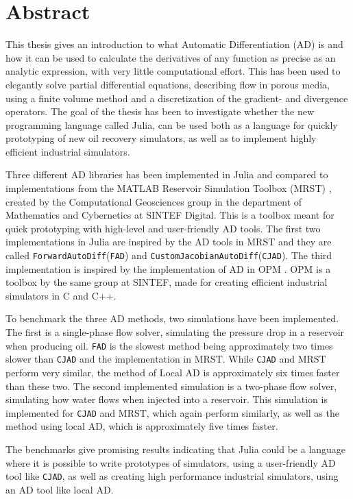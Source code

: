 \chapter*{Abstract}
This thesis gives an introduction to what Automatic Differentiation (AD) is and how it can be used to calculate the derivatives of any function as precise as an analytic expression, with very little computational effort. This has been used to elegantly solve partial differential equations, describing flow in porous media, using a finite volume method and a discretization of the gradient- and divergence operators. The goal of the thesis has been to investigate whether the new programming language called Julia, can be used both as a language for quickly prototyping of new oil recovery simulators, as well as to implement highly efficient industrial simulators.

Three different AD libraries has been implemented in Julia and compared to implementations from the MATLAB Reservoir Simulation Toolbox (MRST) \emph{\citep{mrstHomepage}}, created by the Computational Geosciences  group  in  the  department  of  Mathematics  and  Cybernetics  at  SINTEF Digital. This is a toolbox meant for quick prototyping with high-level and user-friendly AD tools. The first two implementations in Julia are inspired by the AD tools in MRST and they are called \texttt{ForwardAutoDiff}(\texttt{FAD}) and \texttt{CustomJacobianAutoDiff}(\texttt{CJAD}). The third implementation is inspired by the implementation of AD in OPM \emph{\citep{opm}}. OPM is a toolbox by the same group at SINTEF, made for creating efficient industrial simulators in C and C++. 

To benchmark the three AD methods, two simulations have been implemented. The first is a single-phase flow solver, simulating the pressure drop in a reservoir when producing oil. \texttt{FAD} is the slowest method being approximately two times slower than \texttt{CJAD} and the implementation in MRST. While \texttt{CJAD} and MRST perform very similar, the method of Local AD is approximately six times faster than these two. The second implemented simulation is a two-phase flow solver, simulating how water flows when injected into a reservoir. This simulation is implemented for \texttt{CJAD} and MRST, which again perform similarly, as well as the method using local AD, which is approximately five times faster.

The benchmarks give promising results indicating that Julia could be a language where it is possible to write prototypes of simulators, using a user-friendly AD tool like \texttt{CJAD}, as well as creating high performance industrial simulators, using an AD tool like local AD.